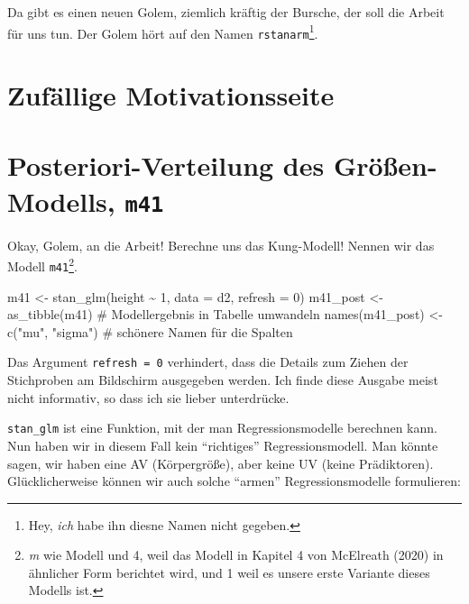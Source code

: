 \documentclass[
  a4paper,
  DIV=11]{scrreprt}
\newenvironment{Shaded}{\begin{snugshade}}{\end{snugshade}}
\newcommand{\AttributeTok}[1]{\textcolor[rgb]{0.40,0.45,0.13}{#1}}
\newcommand{\CommentTok}[1]{\textcolor[rgb]{0.37,0.37,0.37}{#1}}
\newcommand{\DecValTok}[1]{\textcolor[rgb]{0.68,0.00,0.00}{#1}}
\newcommand{\FunctionTok}[1]{\textcolor[rgb]{0.28,0.35,0.67}{#1}}
\newcommand{\NormalTok}[1]{\textcolor[rgb]{0.00,0.23,0.31}{#1}}
\newcommand{\OtherTok}[1]{\textcolor[rgb]{0.00,0.23,0.31}{#1}}
\newcommand{\SpecialCharTok}[1]{\textcolor[rgb]{0.37,0.37,0.37}{#1}}
\newcommand{\StringTok}[1]{\textcolor[rgb]{0.13,0.47,0.30}{#1}}
\theoremstyle{definition}
\theoremstyle{remark}
\begin{document}
Da gibt es einen neuen Golem, ziemlich kräftig der Bursche, der soll die
Arbeit für uns tun. Der Golem hört auf den Namen
\texttt{rstanarm}\footnote{Hey, \emph{ich} habe ihn diesne Namen nicht
  gegeben.}.

\hypertarget{zufuxe4llige-motivationsseite}{%
\section{Zufällige
Motivationsseite}\label{zufuxe4llige-motivationsseite}}

\hypertarget{posteriori-verteilung-des-gruxf6uxdfen-modells-m41}{%
\section{\texorpdfstring{Posteriori-Verteilung des Größen-Modells,
\texttt{m41}}{Posteriori-Verteilung des Größen-Modells, m41}}\label{posteriori-verteilung-des-gruxf6uxdfen-modells-m41}}

Okay, Golem, an die Arbeit! Berechne uns das Kung-Modell! Nennen wir das
Modell \texttt{m41}\footnote{\emph{m} wie Modell und 4, weil das Modell
  in Kapitel 4 von McElreath (2020) in ähnlicher Form berichtet wird,
  und 1 weil es unsere erste Variante dieses Modells ist.}.

\begin{Shaded}
\begin{Highlighting}[]
\NormalTok{m41 }\OtherTok{\textless{}{-}} \FunctionTok{stan\_glm}\NormalTok{(height }\SpecialCharTok{\textasciitilde{}} \DecValTok{1}\NormalTok{, }\AttributeTok{data =}\NormalTok{ d2, }\AttributeTok{refresh =} \DecValTok{0}\NormalTok{)}
\NormalTok{m41\_post }\OtherTok{\textless{}{-}} \FunctionTok{as\_tibble}\NormalTok{(m41)  }\CommentTok{\# Modellergebnis in Tabelle umwandeln}
\FunctionTok{names}\NormalTok{(m41\_post) }\OtherTok{\textless{}{-}} \FunctionTok{c}\NormalTok{(}\StringTok{"mu"}\NormalTok{, }\StringTok{"sigma"}\NormalTok{)  }\CommentTok{\# schönere Namen für die Spalten}
\end{Highlighting}
\end{Shaded}

Das Argument \texttt{refresh\ =\ 0} verhindert, dass die Details zum
Ziehen der Stichproben am Bildschirm ausgegeben werden. Ich finde diese
Ausgabe meist nicht informativ, so dass ich sie lieber unterdrücke.

\texttt{stan\_glm} ist eine Funktion, mit der man Regressionsmodelle
berechnen kann. Nun haben wir in diesem Fall kein ``richtiges''
Regressionsmodell. Man könnte sagen, wir haben eine AV (Körpergröße),
aber keine UV (keine Prädiktoren). Glücklicherweise können wir auch
solche ``armen'' Regressionsmodelle formulieren:
\end{document}

